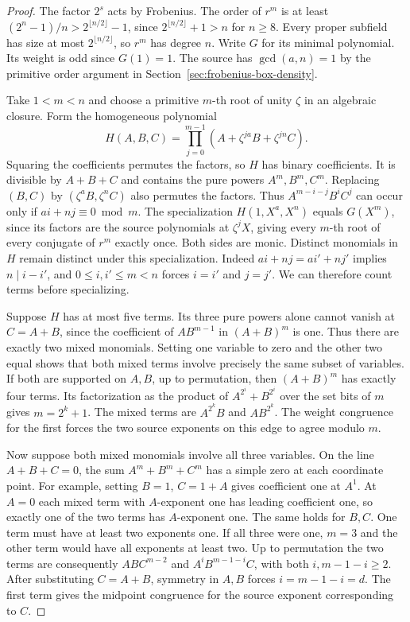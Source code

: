 \documentclass[11pt]{article}
\begin{document}
\begin{proof}
The factor \(2^s\) acts by Frobenius. The order of \(r^m\) is at least
\((2^n-1)/n>2^{\lfloor n/2\rfloor}-1\), since
\(2^{\lfloor n/2\rfloor}+1>n\) for \(n\ge8\). Every proper subfield
has size at most \(2^{\lfloor n/2\rfloor}\), so \(r^m\) has degree
\(n\). Write \(G\) for its minimal polynomial. Its weight is odd
since \(G(1)=1\). The source has \(\gcd(a,n)=1\) by the primitive
order argument in Section~\ref{sec:frobenius-box-density}.

Take \(1<m<n\) and choose a primitive \(m\)-th root of unity \(\zeta\)
in an algebraic closure. Form the homogeneous polynomial
\[
 H(A,B,C)=\prod_{j=0}^{m-1}(A+\zeta^{ja}B+\zeta^{jn}C).
\]
Squaring the coefficients permutes the factors, so \(H\) has binary
coefficients. It is divisible by \(A+B+C\) and contains the pure
powers \(A^m,B^m,C^m\). Replacing \((B,C)\) by
\((\zeta^a B,\zeta^n C)\) also permutes the factors. Thus
\(A^{m-i-j}B^i C^j\) can occur only if \(ai+nj\equiv0\bmod m\).
The specialization \(H(1,X^a,X^n)\) equals \(G(X^m)\), since its
factors are the source polynomials at \(\zeta^jX\), giving every
\(m\)-th root of every conjugate of \(r^m\) exactly once. Both sides
are monic. Distinct monomials in \(H\) remain distinct under this
specialization. Indeed \(ai+nj=ai'+nj'\) implies \(n\mid i-i'\),
and \(0\le i,i'\le m<n\) forces \(i=i'\) and \(j=j'\).
We can therefore count terms before specializing.

Suppose \(H\) has at most five terms. Its three pure powers alone
cannot vanish at \(C=A+B\), since the coefficient of \(A B^{m-1}\)
in \((A+B)^m\) is one. Thus there are exactly two mixed monomials.
Setting one variable to zero and the other two equal shows that both
mixed terms involve precisely the same subset of variables. If both
are supported on \(A,B\), up to permutation, then \((A+B)^m\) has
exactly four terms. Its factorization as the product of
\(A^{2^i}+B^{2^i}\) over the set bits of \(m\) gives
\(m=2^k+1\). The mixed terms are \(A^{2^k}B\) and \(AB^{2^k}\).
The weight congruence for the first forces the two source exponents
on this edge to agree modulo \(m\).

Now suppose both mixed monomials involve all three variables.
On the line \(A+B+C=0\), the sum \(A^m+B^m+C^m\) has a simple
zero at each coordinate point. For example, setting \(B=1\),
\(C=1+A\) gives coefficient one at \(A^1\). At \(A=0\) each mixed
term with \(A\)-exponent one has leading coefficient one, so exactly
one of the two terms has \(A\)-exponent one. The same holds for
\(B,C\). One term must have at least two exponents one. If all three
were one, \(m=3\) and the other term would have all exponents at
least two. Up to permutation the two terms are consequently
\(AB C^{m-2}\) and \(A^i B^{m-1-i} C\), with both \(i,m-1-i\ge2\).
After substituting \(C=A+B\), symmetry in \(A,B\) forces
\(i=m-1-i=d\). The first term gives the midpoint congruence for the
source exponent corresponding to \(C\).


\end{proof}
\end{document}
